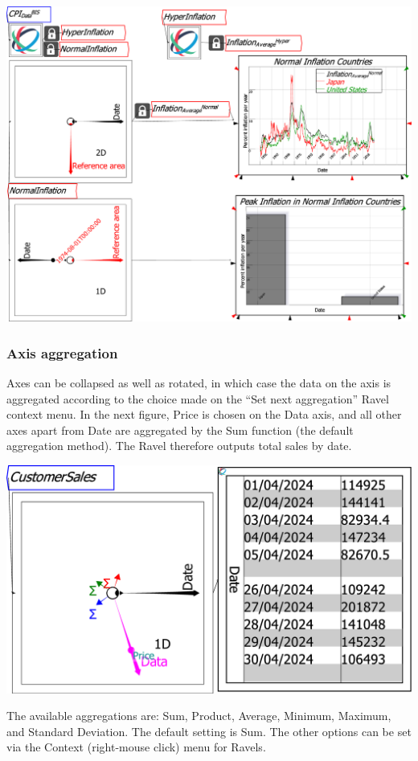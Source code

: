 \includegraphics[width=15cm]{images/CPI_SubsetsAxisRotation}

\subsubsection{Axis aggregation}

Axes can be collapsed as well as rotated, in which case the data on
the axis is aggregated according to the choice made on the ``Set
next aggregation'' Ravel context menu. In the next figure, Price
is chosen on the Data axis, and all other axes apart from Date are
aggregated by the Sum function (the default aggregation method). The
Ravel therefore outputs total sales by date.

\includegraphics[width=15cm]{images/SmallBusinessAggregation}

The available aggregations are: Sum, Product, Average, Minimum, Maximum,
and Standard Deviation. The default setting is Sum. The other options
can be set via the Context (right-mouse click) menu for Ravels.

